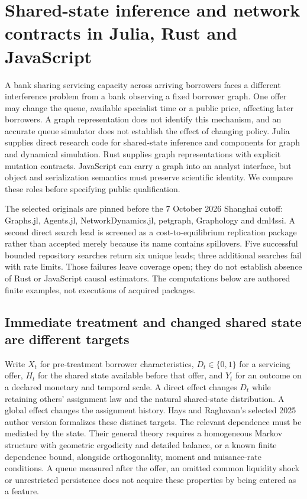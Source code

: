\section[Shared-state and remaining-language networks]{Shared-state inference and network contracts in Julia, Rust and JavaScript}
\label{sec:exec25-onet}

A bank sharing servicing capacity across arriving borrowers faces a different
interference problem from a bank observing a fixed borrower graph. One offer
may change the queue, available specialist time or a public price, affecting
later borrowers. A graph representation does not identify this mechanism, and
an accurate queue simulator does not establish the effect of changing policy.
Julia supplies direct research code for shared-state inference and components
for graph and dynamical simulation. Rust supplies graph representations with
explicit mutation contracts. JavaScript can carry a graph into an analyst
interface, but object and serialization semantics must preserve scientific
identity. We compare these roles before specifying public qualification.

The selected originals are pinned before the 7 October 2026 Shanghai cutoff:
Graphs.jl, Agents.jl, NetworkDynamics.jl, petgraph, Graphology and dml4ssi.
A second direct search lead is screened as a cost-to-equilibrium replication
package rather than accepted merely because its name contains spillovers.
Five successful bounded repository searches return six unique leads; three
additional searches fail with rate limits. Those failures leave coverage open;
they do not establish absence of Rust or JavaScript causal estimators. The
computations below are authored finite examples, not executions of acquired
packages.\citep{exec25_onet_choice}

\subsection{Immediate treatment and changed shared state are different targets}

Write $X_t$ for pre-treatment borrower characteristics, $D_t\in\{0,1\}$ for a
servicing offer, $H_t$ for the shared state available before that offer, and
$Y_t$ for an outcome on a declared monetary and temporal scale. A direct effect
changes $D_t$ while retaining others' assignment law and the natural
shared-state distribution. A global effect changes the assignment history.
Hays and Raghavan's selected 2025 author version formalizes these distinct
targets. The relevant dependence must be mediated by the state. Their general
theory requires a homogeneous Markov structure with geometric ergodicity and
detailed balance, or a known finite dependence bound, alongside orthogonality,
moment and nuisance-rate conditions. A queue measured after the offer, an
omitted common liquidity shock or unrestricted persistence does not acquire
these properties by being entered as a feature.\citep{exec25_onet_paper}

